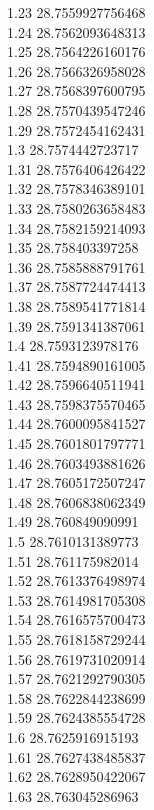 {1.23	28.7559927756468\\
1.24	28.7562093648313\\
1.25	28.7564226160176\\
1.26	28.7566326958028\\
1.27	28.7568397600795\\
1.28	28.7570439547246\\
1.29	28.7572454162431\\
1.3	28.7574442723717\\
1.31	28.7576406426422\\
1.32	28.7578346389101\\
1.33	28.7580263658483\\
1.34	28.7582159214093\\
1.35	28.758403397258\\
1.36	28.7585888791761\\
1.37	28.7587724474413\\
1.38	28.7589541771814\\
1.39	28.7591341387061\\
1.4	28.7593123978176\\
1.41	28.7594890161005\\
1.42	28.7596640511941\\
1.43	28.7598375570465\\
1.44	28.7600095841527\\
1.45	28.7601801797771\\
1.46	28.7603493881626\\
1.47	28.7605172507247\\
1.48	28.7606838062349\\
1.49	28.760849090991\\
1.5	28.7610131389773\\
1.51	28.761175982014\\
1.52	28.7613376498974\\
1.53	28.7614981705308\\
1.54	28.7616575700473\\
1.55	28.7618158729244\\
1.56	28.7619731020914\\
1.57	28.7621292790305\\
1.58	28.7622844238699\\
1.59	28.7624385554728\\
1.6	28.7625916915193\\
1.61	28.7627438485837\\
1.62	28.7628950422067\\
1.63	28.763045286963\\
}
